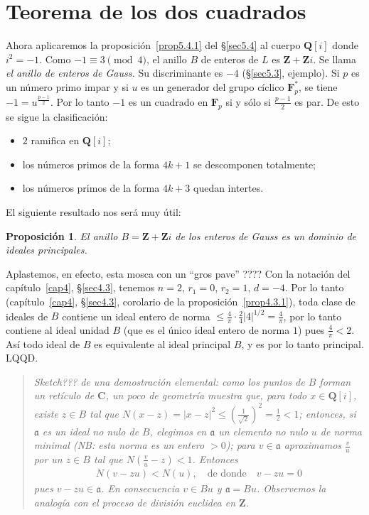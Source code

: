 \documentclass[bibtotoc,leqno,spanish]{amsbook}
\newcommand{\QQ}{\mathbf{Q}}
\newcommand{\ZZ}{\mathbf{Z}}
\newcommand{\FF}{\mathbf{F}}
\newcommand{\CC}{\mathbf{C}}
\newcommand{\idl}[1]{\mathfrak{#1}}
\newcommand{\QED}{LQQD.}
\newcommand{\abs}[1]{\left\lvert#1\right\rvert}
\numberwithin{equation}{section}
\newenvironment{comm}%
	{\begin{quotation}\itshape\Small}
	{\end{quotation}}
\theoremstyle{note}
\theoremstyle{note}
\newtheorem{proposition}{Proposici\'on}
\theoremstyle{rem}
\numberwithin{theorem}{section}
\numberwithin{proposition}{section}
\numberwithin{definition}{section}
\numberwithin{lemma}{section}
\numberwithin{corollary}{section}
\numberwithin{example}{section}
\numberwithin{footnote}{section}%
\begin{document}
\section{Teorema de los dos cuadrados}\label{sec5.6}

Ahora aplicaremos la proposici\'on~\ref{prop5.4.1} del \S\ref{sec5.4} al cuerpo $\QQ[i]$ donde $i^{2}=-1$. Como $-1\equiv 3\pmod 4$,
el anillo $B$ de enteros de $L$ es $\ZZ+\ZZ i$. Se llama {\em el anillo de enteros de Gauss.} Su discriminante
es $-4$ (\S\ref{sec5.3}, ejemplo). Si $p$ es un n\'umero primo impar y si $u$ es un generador del grupo c\'iclico
$\FF_{p}^{*}$, se tiene $-1=u^{\frac{p-1}{2}}$. Por lo tanto $-1$ es un cuadrado en $\FF_{p}$ si y s\'olo si
$\frac{p-1}{2}$ es par. De esto se sigue la clasificaci\'on:
\begin{itemize}
\item $2$ ramifica en $\QQ[i]$;
\item los n\'umeros primos de la forma $4k+1$ se descomponen totalmente;
\item los n\'umeros primos de la forma $4k+3$ quedan intertes.
\end{itemize}
El siguiente resultado nos ser\'a muy \'util:

\begin{proposition}\label{prop5.6.1}
El anillo $B = \ZZ+\ZZ i$ de los enteros de Gauss es un dominio de ideales principales.
\end{proposition}

Aplastemos, en efecto, esta mosca con un ``gros pave'' ???? Con la notaci\'on del cap\'itulo~\ref{cap4},
\S\ref{sec4.3}, tenemos $n=2$, $r_{1}=0$, $r_{2}=1$, $d=-4$. Por lo tanto (cap\'itulo~\ref{cap4}, \S\ref{sec4.3},
corolario de la proposici\'on~\ref{prop4.3.1}),
toda clase de ideales de $B$ contiene un ideal entero de norma $\leq\frac{4}{\pi}\cdot\frac{2}{4}
\abs{4}^{1/2}=\frac{4}{\pi}$, por lo tanto contiene al ideal unidad $B$ (que es el \'unico ideal entero de
norma $1$) pues $\frac{4}{\pi}<2$. As\'i todo ideal de $B$ es equivalente al ideal principal $B$, y es por
lo tanto principal. \QED

\begin{comm}
{\em Sketch???} de una demostraci\'on elemental: como los puntos de $B$ forman un ret\'iculo de $\CC$,
un poco de geometr\'ia muestra que, para todo $x\in\QQ[i]$, existe $z\in B$ tal que
$N(x-z)=\abs{x-z}^{2}\leq\left(\frac{1}{\sqrt{2}}\right)^{2}=\frac{1}{2}< 1$; entonces, si $\idl{a}$ es un
ideal no nulo de $B$, elegimos en $\idl{a}$ un elemento no nulo $u$ de norma minimal (NB: esta norma es un
entero $>0$); para $v\in\idl{a}$ aproximamos $\frac{v}{u}$ por un $z\in B$ tal que $N\left(\frac{v}{u}-z\right)<1$.
Entonces
\begin{gather*}
N(v-zu) < N(u),\quad\text{de donde}\quad v-zu=0
\end{gather*}
pues $v-zu\in\idl{a}$. En consecuencia $v\in Bu$ y $\idl{a}=Bu$. Observemos la analog\'ia con el proceso de
divisi\'on euclidea en $\ZZ$.
\end{comm}
\end{document}
